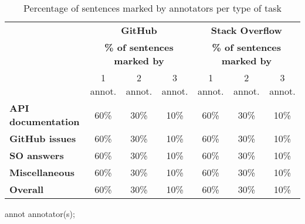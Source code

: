\begin{table}[H]
\centering    
\caption{Percentage of sentences marked by annotators per type of task}
\label{tbl:corpus-annotation-overlap-by-task}
\begin{scriptsize}
\begin{threeparttable}
\begin{tabular}{lcccccc}



& \multicolumn{3}{c}{\textbf{GitHub}} & \multicolumn{3}{c}{\textbf{Stack Overflow}} \\

& \multicolumn{3}{c}{\textbf{\% of sentences marked by}} & \multicolumn{3}{c}{\textbf{\% of sentences marked by}}
\\ \cmidrule(l){2-4}  \cmidrule(l){5-7} 

&  1 annot. &  2 annot. &  3 annot. 
%
&  1 annot. &  2 annot. &  3 annot. 
\\

\hline

\textbf{API documentation} 
& 60\% & 30\% & 10\% %
& 60\% & 30\% & 10\% %
\\
\textbf{GitHub issues} 
& 60\% & 30\% & 10\% %
& 60\% & 30\% & 10\% %
\\
\textbf{SO answers} 
& 60\% & 30\% & 10\% %
& 60\% & 30\% & 10\% %
\\
\textbf{Miscellaneous} 
& 60\% & 30\% & 10\% %
& 60\% & 30\% & 10\% %
\\

\hline
\textbf{Overall} 
& 60\% & 30\% & 10\% %
& 60\% & 30\% & 10\% %
\\
\hline

\end{tabular}
\begin{tablenotes}
    \item[annot] annotator(s);
\end{tablenotes}
\end{threeparttable}
\end{scriptsize}
\end{table}

